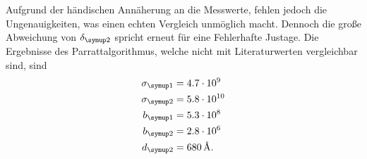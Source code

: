Aufgrund der händischen Annäherung an die Messwerte, fehlen jedoch die Ungenauigkeiten, was einen echten Vergleich unmöglich macht. 
Dennoch die große Abweichung von $\delta\idx{2}$ spricht erneut für eine Fehlerhafte Justage. Die Ergebnisse des Parrattalgorithmus, welche 
nicht mit Literaturwerten vergleichbar sind, sind 
\begin{equation}
    \begin{aligned}
        \sigma\idx{1} &= 4.7\cdot 10^{9} \\
        \sigma\idx{2} &= 5.8\cdot 10^{10} \\
        b\idx{1} &= 5.3\cdot 10^{8} \\
        b\idx{2} &= 2.8\cdot 10^{6} \\
        d\idx{2} &=  680\,\si{\angstrom}.
    \end{aligned}
\end{equation}